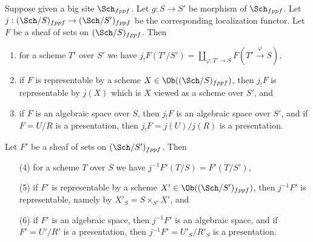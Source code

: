 \begin{lemma}
\label{lemma-change-base-scheme}
Suppose given a big site $\Sch_{fppf}$.
Let $g : S \to S'$ be morphism of $\Sch_{fppf}$.
Let $j : (\Sch/S)_{fppf} \to (\Sch/S')_{fppf}$ be
the corresponding localization functor.
Let $F$ be a sheaf of sets on $(\Sch/S)_{fppf}$.
Then
\begin{enumerate}
\item for a scheme $T'$ over $S'$ we have
$j_!F(T'/S') =
\coprod\nolimits_{\varphi : T' \to S} F(T' \xrightarrow{\varphi} S),$
\item if $F$ is representable by a scheme
$X \in \Ob((\Sch/S)_{fppf})$,
then $j_!F$ is representable by $j(X)$ which is
$X$ viewed as a scheme over $S'$, and
\item if $F$ is an algebraic space over $S$, then $j_!F$ is an algebraic
space over $S'$, and if $F = U/R$ is a presentation, then
$j_!F = j(U)/j(R)$ is a presentation.
\end{enumerate}
Let $F'$ be a sheaf of sets on $(\Sch/S')_{fppf}$. Then
\begin{enumerate}
\item[(4)] for a scheme $T$ over $S$ we have $j^{-1}F'(T/S) = F'(T/S')$,
\item[(5)] if $F'$ is representable by a scheme
$X' \in \Ob((\Sch/S')_{fppf})$, then
$j^{-1}F'$ is representable, namely by $X'_S = S \times_{S'} X'$, and
\item[(6)] if $F'$ is an algebraic space, then
$j^{-1}F'$ is an algebraic space, and if $F' = U'/R'$ is a presentation,
then $j^{-1}F' = U'_S/R'_S$ is a presentation.
\end{enumerate}
\end{lemma}

